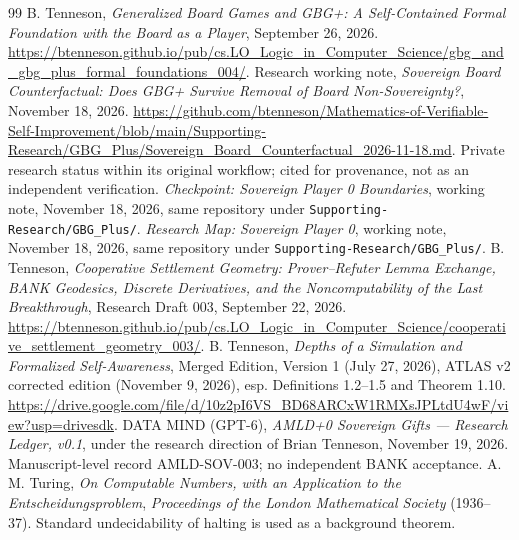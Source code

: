 \documentclass[11pt,letterpaper]{article}
\theoremstyle{definition}\newtheorem{definition}[theorem]{Definition}\newtheorem{example}[theorem]{Example}
\theoremstyle{remark}\newtheorem{remark}[theorem]{Remark}
\newcommand{\burl}[1]{\url{#1}}
\begin{document}
\begin{thebibliography}{99}
 B. Tenneson, \emph{Generalized Board Games and GBG+: A Self-Contained Formal Foundation with the Board as a Player}, September 26, 2026. \burl{https://btenneson.github.io/pub/cs.LO_Logic_in_Computer_Science/gbg_and_gbg_plus_formal_foundations_004/}.
 Research working note, \emph{Sovereign Board Counterfactual: Does GBG+ Survive Removal of Board Non-Sovereignty?}, November 18, 2026. \burl{https://github.com/btenneson/Mathematics-of-Verifiable-Self-Improvement/blob/main/Supporting-Research/GBG_Plus/Sovereign_Board_Counterfactual_2026-11-18.md}. Private research status within its original workflow; cited for provenance, not as an independent verification.
 \emph{Checkpoint: Sovereign Player 0 Boundaries}, working note, November 18, 2026, same repository under \texttt{Supporting-Research/GBG\_Plus/}.
 \emph{Research Map: Sovereign Player 0}, working note, November 18, 2026, same repository under \texttt{Supporting-Research/GBG\_Plus/}.
 B. Tenneson, \emph{Cooperative Settlement Geometry: Prover--Refuter Lemma Exchange, BANK Geodesics, Discrete Derivatives, and the Noncomputability of the Last Breakthrough}, Research Draft 003, September 22, 2026. \burl{https://btenneson.github.io/pub/cs.LO_Logic_in_Computer_Science/cooperative_settlement_geometry_003/}.
 B. Tenneson, \emph{Depths of a Simulation and Formalized Self-Awareness}, Merged Edition, Version 1 (July 27, 2026), ATLAS v2 corrected edition (November 9, 2026), esp. Definitions 1.2--1.5 and Theorem 1.10. \burl{https://drive.google.com/file/d/10z2pI6VS_BD68ARCxW1RMXsJPLtdU4wF/view?usp=drivesdk}.
 DATA MIND (GPT-6), \emph{AMLD+0 Sovereign Gifts --- Research Ledger, v0.1}, under the research direction of Brian Tenneson, November 19, 2026. Manuscript-level record AMLD-SOV-003; no independent BANK acceptance.
 A. M. Turing, \emph{On Computable Numbers, with an Application to the Entscheidungsproblem}, \emph{Proceedings of the London Mathematical Society} (1936--37). Standard undecidability of halting is used as a background theorem.


\end{thebibliography}
\end{document}
